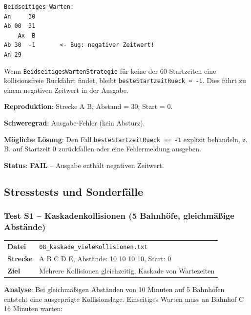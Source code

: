 \documentclass[12pt,a4paper]{article}
\newcommand{\fail}{\textcolor{failred}{\textbf{FAIL}}}
\begin{document}
\begin{lstlisting}[caption={Fehlerhafte Ausgabe F2 -- negativer Zeitwert}]
Beidseitiges Warten:
An     30
Ab 00  31
    Ax  B
Ab 30  -1       <- Bug: negativer Zeitwert!
An 29
\end{lstlisting}

\begin{bugbox}[title={Bug: Negativer Zeitwert bei unlösbarer Kollision}]
Wenn \texttt{BeidseitigesWartenStrategie} für keine der 60 Startzeiten eine kollisionsfreie Rückfahrt findet, bleibt \texttt{besteStartzeitRueck = -1}. Dies führt zu einem negativen Zeitwert in der Ausgabe.

\textbf{Reproduktion}: Strecke A B, Abstand = 30, Start = 0.

\textbf{Schweregrad}: Ausgabe-Fehler (kein Absturz).

\textbf{Mögliche Lösung}: Den Fall \texttt{besteStartzeitRueck == -1} explizit behandeln, z.\,B. auf Startzeit 0 zurückfallen oder eine Fehlermeldung ausgeben.
\end{bugbox}

\textbf{Status}: \fail{} -- Ausgabe enthält negativen Zeitwert.

\subsection{Stresstests und Sonderfälle}

\subsubsection{Test S1 -- Kaskadenkollisionen (5 Bahnhöfe, gleichmäßige Abstände)}

\begin{center}
\begin{tabular}{ll}
\toprule
\textbf{Datei} & \texttt{08\_kaskade\_vieleKollisionen.txt} \\
\textbf{Strecke} & A B C D E, Abstände: 10 10 10 10, Start: 0 \\
\textbf{Ziel} & Mehrere Kollisionen gleichzeitig, Kaskade von Wartezeiten \\
\bottomrule
\end{tabular}
\end{center}

\textbf{Analyse}: Bei gleichmäßigen Abständen von 10 Minuten auf 5 Bahnhöfen entsteht eine ausgeprägte Kollisionslage. Einseitiges Warten muss an Bahnhof C 16 Minuten warten:
\end{document}
